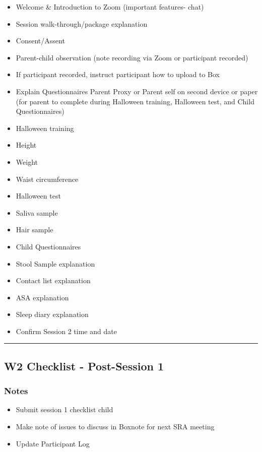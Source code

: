\documentclass[
]{book}
\providecommand{\tightlist}{%
  \setlength{\itemsep}{0pt}\setlength{\parskip}{0pt}}
\begin{document}
\begin{itemize}
\tightlist
\item
  Welcome \& Introduction to Zoom (important features- chat)
\item
  Session walk-through/package explanation
\item
  Consent/Assent
\item
  Parent-child observation (note recording via Zoom or participant recorded)
\item
  If participant recorded, instruct participant how to upload to Box
\item
  Explain Questionnaires Parent Proxy or Parent self on second device or paper (for parent to complete during Halloween training, Halloween test, and Child Questionnaires)
\item
  Halloween training
\item
  Height
\item
  Weight
\item
  Waist circumference
\item
  Halloween test
\item
  Saliva sample
\item
  Hair sample
\item
  Child Questionnaires
\item
  Stool Sample explanation
\item
  Contact list explanation
\item
  ASA explanation
\item
  Sleep diary explanation
\item
  Confirm Session 2 time and date
\end{itemize}

\begin{center}\rule{0.5\linewidth}{0.5pt}\end{center}

\hypertarget{w2-checklist---post-session-1}{%
\subsection{W2 Checklist - Post-Session 1}\label{w2-checklist---post-session-1}}

\hypertarget{notes-2}{%
\subsubsection{Notes}\label{notes-2}}

\begin{itemize}
\tightlist
\item
  Submit session 1 checklist child
\item
  Make note of issues to discuss in Boxnote for next SRA meeting
\item
  Update Participant Log
\end{itemize}
\end{document}
